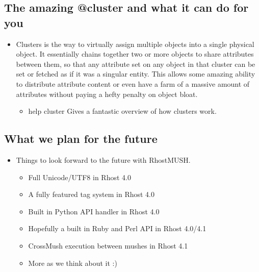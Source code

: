 \documentclass[letterpaper,10pt,english]{sphinxmanual}
\begin{document}
\subsection{The amazing @cluster and what it can do for you}
\label{\detokenize{features:the-amazing-cluster-and-what-it-can-do-for-you}}\begin{itemize}
\item {} 
\sphinxAtStartPar
Clusters is the way to virtually assign multiple objects into
a single physical object.  It essentially chains together two
or more objects to share attributes between them, so that any
attribute set on any object in that cluster can be set or fetched
as if it was a singular entity.  This allows some amazing ability
to distribute attribute content or even have a farm of a massive
amount of attributes without paying a hefty penalty on object bloat.
\begin{itemize}
\item {} 
\sphinxAtStartPar
help cluster  \sphinxhyphen{}\sphinxhyphen{} Gives a fantastic overview of how clusters work.

\end{itemize}

\end{itemize}


\subsection{What we plan for the future}
\label{\detokenize{features:what-we-plan-for-the-future}}\begin{itemize}
\item {} 
\sphinxAtStartPar
Things to look forward to the future with RhostMUSH.
\begin{itemize}
\item {} 
\sphinxAtStartPar
Full Unicode/UTF8 in Rhost 4.0

\item {} 
\sphinxAtStartPar
A fully featured tag system in Rhost 4.0

\item {} 
\sphinxAtStartPar
Built in Python API handler in Rhost 4.0

\item {} 
\sphinxAtStartPar
Hopefully a built in Ruby and Perl API in Rhost 4.0/4.1

\item {} 
\sphinxAtStartPar
Cross\sphinxhyphen{}Mush execution between mushes in Rhost 4.1

\item {} 
\sphinxAtStartPar
More as we think about it :)

\end{itemize}

\end{itemize}
\end{document}
